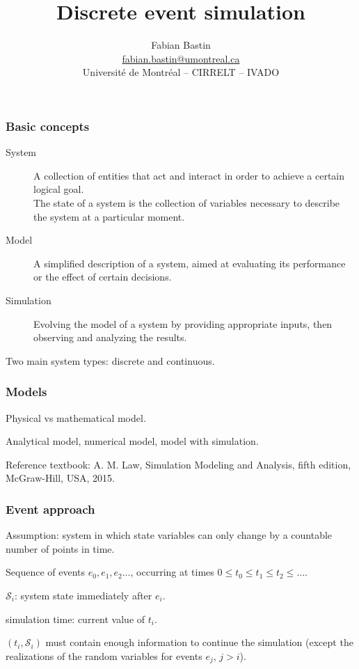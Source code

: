\documentclass[t,usepdftitle=false]{beamer}
\title[Simulation]{Discrete event simulation}
\author[Fabian Bastin]{Fabian Bastin \\ \url{fabian.bastin@umontreal.ca} \\ Université de Montréal -- CIRRELT -- IVADO}
\date{}
\def\cS{\mathcal{S}}
\begin{document}
\frame{\titlepage}

\begin{frame}
	\frametitle{Basic concepts}
	
	\begin{description}
		\item[System]
		A collection of entities that act and interact in order to achieve a certain logical goal.\\
		The state of a system is the collection of variables necessary to describe the system at a particular moment.
		\item[Model]
		A simplified description of a system, aimed at evaluating its performance or the effect of certain decisions.
		\item[Simulation]
		Evolving the model of a system by providing appropriate inputs, then observing and analyzing the results.
	\end{description}
	
	\mbox{}
	
	Two main system types: discrete and continuous.
	
\end{frame}

\begin{frame}
	\frametitle{Models}
	
	Physical vs mathematical model.
	
	\mbox{}
	
	Analytical model, numerical model, model with simulation.

\mbox{}

Reference textbook: 
A. M. Law, Simulation Modeling and Analysis, fifth edition, McGraw-Hill, USA, 2015.

\end{frame}

\begin{frame}
\frametitle{Event approach}

Assumption: system in which state variables can only change by a countable number of points in time.

\mbox{}

Sequence of events $e_0, e_1, e_2\ldots$, occurring at times $0 \leq t_0 \leq t_1 \leq t_2 \leq \ldots$. 

\mbox{}

${\cS_i}$: system state immediately after ${e_i}$.

\mbox{}

simulation time: current value of ${t_i}$.

\mbox{}

$(t_i,\cS_i)$ must contain enough information to continue the simulation (except the realizations of the random variables for events $e_j$, $j > i$).

\end{frame}
\end{document}
